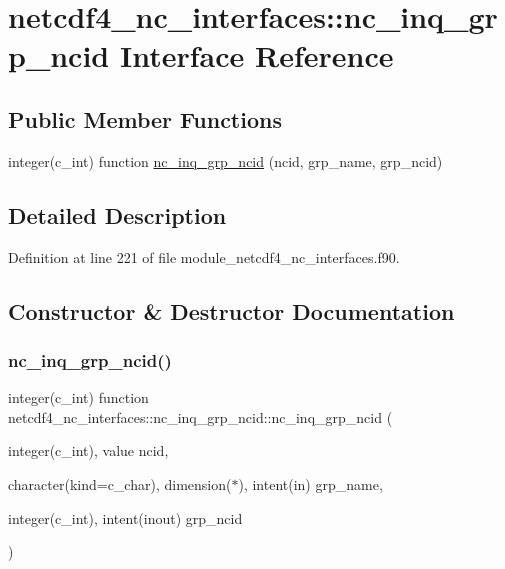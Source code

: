 \hypertarget{interfacenetcdf4__nc__interfaces_1_1nc__inq__grp__ncid}{}\section{netcdf4\+\_\+nc\+\_\+interfaces\+:\+:nc\+\_\+inq\+\_\+grp\+\_\+ncid Interface Reference}
\label{interfacenetcdf4__nc__interfaces_1_1nc__inq__grp__ncid}
\subsection*{Public Member Functions}
\begin{DoxyCompactItemize}
\item 
integer(c\+\_\+int) function \hyperlink{interfacenetcdf4__nc__interfaces_1_1nc__inq__grp__ncid_a5a6b448708745505364fe78652e85ca9}{nc\+\_\+inq\+\_\+grp\+\_\+ncid} (ncid, grp\+\_\+name, grp\+\_\+ncid)
\end{DoxyCompactItemize}


\subsection{Detailed Description}


Definition at line 221 of file module\+\_\+netcdf4\+\_\+nc\+\_\+interfaces.\+f90.



\subsection{Constructor \& Destructor Documentation}
\mbox{\label{interfacenetcdf4__nc__interfaces_1_1nc__inq__grp__ncid_a5a6b448708745505364fe78652e85ca9}} 
\subsubsection{\texorpdfstring{nc\+\_\+inq\+\_\+grp\+\_\+ncid()}{nc\_inq\_grp\_ncid()}}
{\footnotesize\ttfamily integer(c\+\_\+int) function netcdf4\+\_\+nc\+\_\+interfaces\+::nc\+\_\+inq\+\_\+grp\+\_\+ncid\+::nc\+\_\+inq\+\_\+grp\+\_\+ncid (\begin{DoxyParamCaption}\item[{integer(c\+\_\+int), value}]{ncid,  }\item[{character(kind=c\+\_\+char), dimension($\ast$), intent(in)}]{grp\+\_\+name,  }\item[{integer(c\+\_\+int), intent(inout)}]{grp\+\_\+ncid }\end{DoxyParamCaption})}



